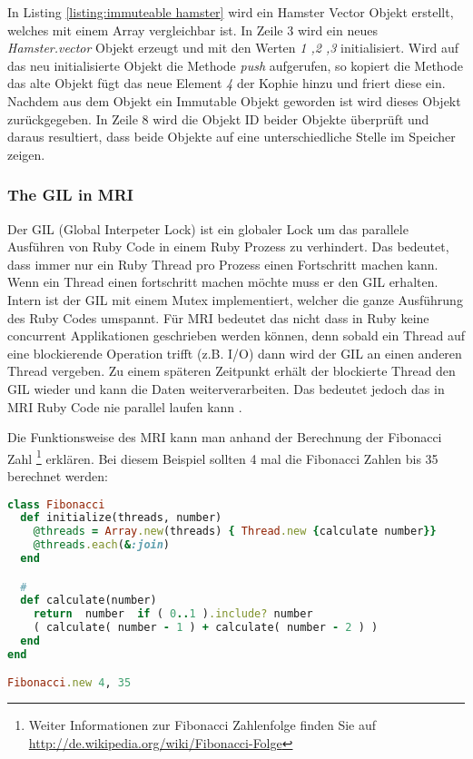 In Listing \ref{listing:immuteable hamster} wird ein Hamster Vector Objekt erstellt, welches mit einem Array vergleichbar ist. In Zeile 3 wird ein neues \emph{Hamster.vector} Objekt erzeugt und mit den Werten \emph{1 ,2 ,3} initialisiert. Wird auf das neu initialisierte Objekt die Methode \emph{push} aufgerufen, so kopiert die Methode das alte Objekt fügt das neue Element \emph{4} der Kophie hinzu und friert diese ein. Nachdem aus dem Objekt ein Immutable Objekt geworden ist wird dieses Objekt zurückgegeben. In Zeile 8 wird die Objekt ID beider Objekte überprüft und daraus resultiert, dass beide Objekte auf eine unterschiedliche Stelle im Speicher zeigen. 

\subsubsection{The GIL in MRI}

Der GIL (Global Interpeter Lock) ist ein globaler Lock um das parallele Ausführen von Ruby Code in einem Ruby Prozess zu verhindert. Das bedeutet, dass immer nur ein Ruby Thread pro Prozess einen Fortschritt machen kann. Wenn ein Thread einen fortschritt machen möchte muss er den GIL erhalten. Intern ist der GIL mit einem Mutex implementiert, welcher die ganze Ausführung des Ruby Codes umspannt. Für MRI bedeutet das nicht dass in Ruby keine concurrent Applikationen geschrieben werden können, denn sobald ein Thread auf eine blockierende Operation trifft (z.B. I/O) dann wird der GIL an einen anderen Thread vergeben. Zu einem späteren Zeitpunkt erhält der blockierte Thread den GIL wieder und kann die Daten weiterverarbeiten. Das bedeutet jedoch das in MRI Ruby Code nie parallel laufen kann \cite[p. 42]{Sto2013}. 


Die Funktionsweise des MRI kann man anhand der Berechnung der Fibonacci Zahl \footnote{Weiter Informationen zur Fibonacci Zahlenfolge finden Sie auf \url{http://de.wikipedia.org/wiki/Fibonacci-Folge}} erklären. Bei diesem Beispiel sollten 4 mal die Fibonacci Zahlen bis 35 berechnet werden:

\begin{lstlisting}[language=Ruby,label={listing:fibonacci},caption={Adaptiert von \cite{Sto2013}, Seite 21}]
class Fibonacci
  def initialize(threads, number)
    @threads = Array.new(threads) { Thread.new {calculate number}}
    @threads.each(&:join)
  end

  #
  def calculate(number)
    return  number  if ( 0..1 ).include? number
    ( calculate( number - 1 ) + calculate( number - 2 ) )
  end
end

Fibonacci.new 4, 35
\end{lstlisting}

